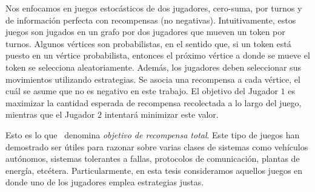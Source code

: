 	Nos enfocamos en juegos estocásticos de dos jugadores, cero-suma, por turnos y de información perfecta con recompensas (no negativas)\cite{FilarV96}. 
	Intuitivamente, estos juegos son jugados en un grafo por dos jugadores que mueven un token por turnos. Algunos vértices son probabilistas, en el sentido que, si un token está puesto en un vértice probabilista, entonces el próximo vértice a donde se mueve el token se selecciona aleatoriamente. Además, los jugadores deben seleccionar sus movimientos utilizando estrategias. Se asocia una recompensa a cada vértice, el cuál se asume que no es negativo en este trabajo. El objetivo del Jugador $1$ es maximizar la cantidad esperada de recompensa recolectada a lo largo del juego, mientras que el Jugador $2$ intentará minimizar este valor.
	
	Esto es lo que~\cite{SvorenovaKwiatkowska16} denomina \emph{objetivo de recompensa total}.
	Este tipo de juegos han demostrado ser útiles para razonar sobre varias clases de sistemas como vehículos autónomos, sistemas tolerantes a fallas, protocolos de comunicación, plantas de energía, etcétera.  %
        Particularmente, en esta tesis consideramos aquellos juegos en donde uno de los jugadores emplea estrategias justas.

